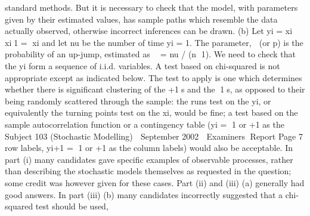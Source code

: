 standard methods. But it is necessary to check that the model, with
parameters given by their estimated values, has sample paths which
resemble the data actually observed, otherwise incorrect inferences can
be drawn.
(b) Let yi = xi  xi1 = xi and let nu be the number of time yi = 1. The
parameter,  (or p) is the probability of an up-jump, estimated as
 = nu / (n 1).
We need to check that the yi form a sequence of i.i.d. variables. A test
based on chi-squared is not appropriate except as indicated below.
The test to apply is one which determines whether there is significant
clustering of the +1s and the 1s, as opposed to their being randomly
scattered through the sample: the runs test on the yi, or equivalently the
turning points test on the xi, would be fine; a test based on the sample
autocorrelation function or a contingency table (yi = 1 or +1 as the
Subject 103 (Stochastic Modelling)  September 2002  Examiners Report
Page 7
row labels, yi+1 = 1 or +1 as the column labels) would also be
acceptable.
In part (i) many candidates gave specific examples of observable processes, rather than
describing the stochastic models themselves as requested in the question; some credit was
however given for these cases. Part (ii) and (iii) (a) generally had good answers. In part
(iii) (b) many candidates incorrectly suggested that a chi-squared test should be used,
